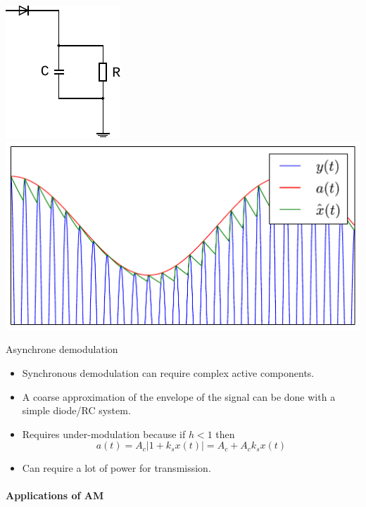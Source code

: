 \begin{center}
\includegraphics[width=.2\linewidth]{imgs/fourier/demod_asynchrone}\hspace{1cm}
\includegraphics[width=.5\linewidth]{imgs/fourier/demod_ampl_async.pdf}
\end{center}
\begin{block}{Asynchrone demodulation}
  \begin{itemize}
  \item Synchronous demodulation can require complex active components.
  \item A coarse approximation of the envelope of the signal can be done with a  simple diode/RC system.
  \item Requires under-modulation because if $h<1$ then
$$a(t)=A_c|1+k_sx(t)|=A_c+ A_ck_sx(t)$$
\item Can require a lot of power for transmission.
  \end{itemize}
\end{block}


\paragraph{Applications of AM}



